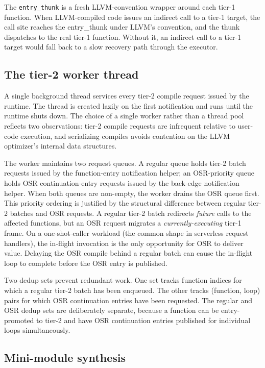 The \texttt{entry\_thunk} is a fresh LLVM-convention wrapper around each tier-1 function. When LLVM-compiled code issues an indirect call to a tier-1 target, the call site reaches the entry\_thunk under LLVM's convention, and the thunk dispatches to the real tier-1 function. Without it, an indirect call to a tier-1 target would fall back to a slow recovery path through the executor.

\subsection{The tier-2 worker thread}
\label{sec:design:tier2:worker}

A single background thread services every tier-2 compile request issued by the runtime. The thread is created lazily on the first notification and runs until the runtime shuts down. The choice of a single worker rather than a thread pool reflects two observations: tier-2 compile requests are infrequent relative to user-code execution, and serializing compiles avoids contention on the LLVM optimizer's internal data structures.

The worker maintains two request queues. A regular queue holds tier-2 batch requests issued by the function-entry notification helper; an OSR-priority queue holds OSR continuation-entry requests issued by the back-edge notification helper. When both queues are non-empty, the worker drains the OSR queue first. This priority ordering is justified by the structural difference between regular tier-2 batches and OSR requests. A regular tier-2 batch redirects \emph{future} calls to the affected functions, but an OSR request migrates a \emph{currently-executing} tier-1 frame. On a one-shot-caller workload (the common shape in serverless request handlers), the in-flight invocation is the only opportunity for OSR to deliver value. Delaying the OSR compile behind a regular batch can cause the in-flight loop to complete before the OSR entry is published.

Two dedup sets prevent redundant work. One set tracks function indices for which a regular tier-2 batch has been enqueued. The other tracks (function, loop) pairs for which OSR continuation entries have been requested. The regular and OSR dedup sets are deliberately separate, because a function can be entry-promoted to tier-2 and have OSR continuation entries published for individual loops simultaneously.

\subsection{Mini-module synthesis}
\label{sec:design:tier2:synthesis}

